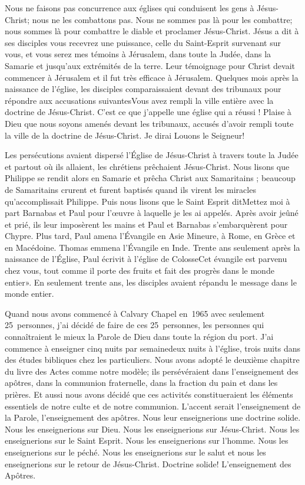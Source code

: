 Nous ne faisons pas concurrence aux églises qui conduisent les gens à Jésus-Christ; nous ne les combattons pas.
Nous ne sommes pas là pour les combattre; nous sommes là pour combattre le diable et proclamer Jésus-Christ.
Jésus a dit à ses disciples \og vous recevrez une puissance, celle du Saint-Esprit survenant sur vous, et vous serez mes
témoins à Jérusalem, dans toute la Judée, dans la Samarie et jusqu’aux extrémités de la terre.\fg{} Leur témoignage pour
Christ devait commencer à Jérusalem et il fut très efficace à Jérusalem. Quelques mois après la naissance de l’église,
les disciples comparaissaient devant des tribunaux pour répondre aux accusations suivantes\frcolon\og Vous avez rempli la
ville entière avec la doctrine de Jésus-Christ.\fg{} C’est ce que j’appelle une église qui a réussi ! Plaise à Dieu que nous
soyons amenés devant les tribunaux, accusés d’avoir rempli toute la ville de la doctrine de Jésus-Christ. Je dirai\frcolon
\og Louons le Seigneur! \fg{}

Les persécutions avaient dispersé l’Église de Jésus-Christ à travers toute la Judée et partout où ils allaient, les
chrétiens prêchaient Jésus-Christ. Nous lisons que Philippe se rendit alors en Samarie et prêcha Christ aux Samaritains
; beaucoup de Samaritains crurent et furent baptisés quand ils virent les miracles qu’accomplissait Philippe. Puis nous
lisons que le Saint Esprit dit\frcolon\og Mettez moi à part Barnabas et Paul pour l’œuvre à laquelle je les ai appelés.\fg{} Après
avoir jeûné et prié, ils leur imposèrent les mains et Paul et Barnabas s’embarquèrent pour Chypre. Plus tard, Paul
amena l’Évangile en Asie Mineure, à Rome, en Grèce et en Macédoine. Thomas emmena l’Évangile en Inde. Trente
ans seulement après la naissance de l’Église, Paul écrivit à l’église de Colosse\frcolon\og Cet évangile est parvenu chez vous,
tout comme il porte des fruits et fait des progrès dans le monde entier». En seulement trente ans, les disciples
avaient répandu le message dans le monde entier.

Quand nous avons commencé à Calvary Chapel en~1965 avec seulement 25~personnes, j’ai décidé de faire de ces 25~personnes,
 les personnes qui connaîtraient le mieux la Parole de Dieu dans toute la région du port. J’ai commence à
enseigner cinq nuits par semaine\frcolon deux nuits à l'église, trois nuits dans des études bibliques chez les particuliers. Nous
avons adopté le deuxième chapitre du livre des Actes comme notre modèle; \og ils persévéraient dans l’enseignement
des apôtres, dans la communion fraternelle, dans la fraction du pain et dans les prières.\fg{} Et aussi nous avons décidé
que ces activités constitueraient les éléments essentiels de notre culte et de notre communion. L’accent serait
l’enseignement de la Parole, \og l’enseignement des apôtres\fg{}. Nous leur enseignerions une doctrine solide. Nous les
enseignerions sur Dieu. Nous les enseignerions sur Jésus-Christ. Nous les enseignerions sur le Saint Esprit. Nous les
enseignerions sur l’homme. Nous les enseignerions sur le péché. Nous les enseignerions sur le salut et nous les
enseignerions sur le retour de Jésus-Christ. Doctrine solide! L’enseignement des Apôtres.

